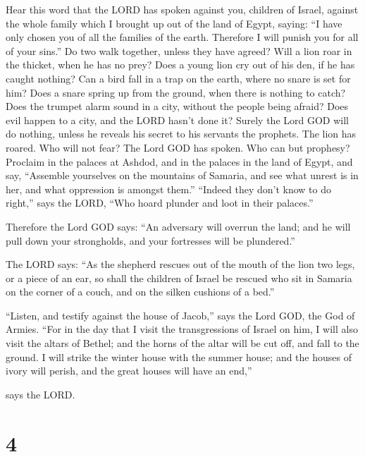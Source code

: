  Hear this word that the LORD has spoken against you,
children of Israel, against the whole family which I brought up out of
the land of Egypt, saying:  ``I have only chosen you of all
the families of the earth. Therefore I will punish you for all of your
sins.''  Do two walk together, unless they have agreed?
 Will a lion roar in the thicket, when he has no prey? Does
a young lion cry out of his den, if he has caught nothing? 
Can a bird fall in a trap on the earth, where no snare is set for him?
Does a snare spring up from the ground, when there is nothing to catch?
 Does the trumpet alarm sound in a city, without the people
being afraid? Does evil happen to a city, and the LORD hasn't done it?
 Surely the Lord GOD will do nothing, unless he reveals his
secret to his servants the prophets.  The lion has roared.
Who will not fear? The Lord GOD has spoken. Who can but prophesy?
 Proclaim in the palaces at Ashdod, and in the palaces in
the land of Egypt, and say, ``Assemble yourselves on the mountains of
Samaria, and see what unrest is in her, and what oppression is amongst
them.''  ``Indeed they don't know to do right,'' says the
LORD, ``Who hoard plunder and loot in their palaces.''

 Therefore the Lord GOD says: ``An adversary will overrun
the land; and he will pull down your strongholds, and your fortresses
will be plundered.''

 The LORD says: ``As the shepherd rescues out of the mouth
of the lion two legs, or a piece of an ear, so shall the children of
Israel be rescued who sit in Samaria on the corner of a couch, and on
the silken cushions of a bed.''

 ``Listen, and testify against the house of Jacob,'' says
the Lord GOD, the God of Armies.  ``For in the day that I
visit the transgressions of Israel on him, I will also visit the altars
of Bethel; and the horns of the altar will be cut off, and fall to the
ground.  I will strike the winter house with the summer
house; and the houses of ivory will perish, and the great houses will
have an end,''

says the LORD.

\hypertarget{section-3}{%
\section{4}\label{section-3}}

